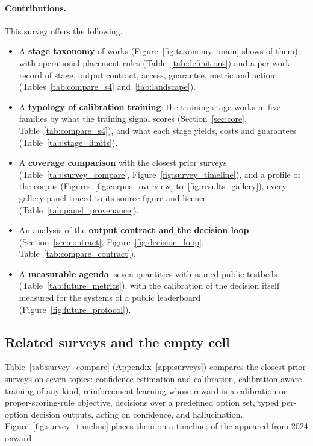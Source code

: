 \paragraph{Contributions.} This survey offers the following.
\begin{itemize}
  \item A \textbf{stage taxonomy} of \nWorks works (Figure~\ref{fig:taxonomy_main} shows \nTaxShown of them), with operational
        placement rules (Table~\ref{tab:definitions}) and a per-work record of stage, output contract,
        access, guarantee, metric and action (Tables~\ref{tab:compare_s4} and~\ref{tab:landscape}).
  \item A \textbf{typology of calibration training}: the \nCore training-stage works in five families
        by what the training signal scores (Section~\ref{sec:core}, Table~\ref{tab:compare_s4}), and
        what each stage yields, costs and guarantees (Table~\ref{tab:stage_limits}).
  \item A \textbf{coverage comparison} with the \nSurveysCompared closest prior surveys
        (Table~\ref{tab:survey_compare}, Figure~\ref{fig:survey_timeline}), and a profile of the corpus
        (Figures~\ref{fig:corpus_overview} to~\ref{fig:results_gallery}), every gallery panel
        traced to its source figure and licence (Table~\ref{tab:panel_provenance}).
  \item An analysis of the \textbf{output contract and the decision loop} (Section~\ref{sec:contract},
        Figure~\ref{fig:decision_loop}, Table~\ref{tab:compare_contract}).
  \item A \textbf{measurable agenda}: seven quantities with named public testbeds
        (Table~\ref{tab:future_metrics}), with the calibration of the decision itself measured for the
        \nDISystems systems of a public leaderboard (Figure~\ref{fig:future_protocol}).
\end{itemize}



\subsection{Related surveys and the empty cell}
\label{sec:related}

Table~\ref{tab:survey_compare} (Appendix~\ref{app:surveys}) compares the \nSurveysCompared closest prior surveys on seven topics:
confidence estimation and calibration, calibration-aware training of any kind, reinforcement learning
whose reward is a calibration or proper-scoring-rule objective, decisions over a predefined option set,
typed per-option decision outputs, acting on confidence, and hallucination.
Figure~\ref{fig:survey_timeline} places them on a timeline; \nSurveysRecent of the \nSurveysCompared
appeared from 2024 onward.


